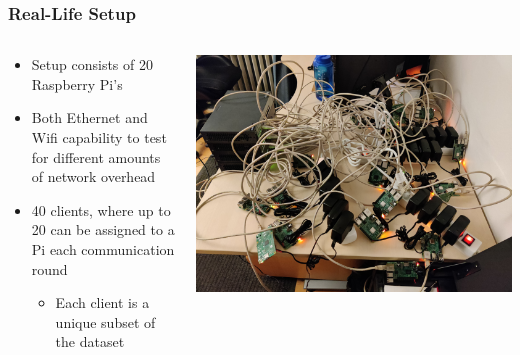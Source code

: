 \documentclass{beamer}
\begin{document}
\begin{frame}
    \frametitle{Real-Life Setup}
    \noindent
    \begin{columns}
	    \begin{column}{.5\textwidth}
		    \begin{itemize}
			    \item Setup consists of 20 Raspberry Pi's 
			    \item Both Ethernet and Wifi capability to test for different amounts of network overhead
			    \item 40 clients, where up to 20 can be assigned to a Pi each communication round
				    \begin{itemize}
					    \item Each client is a unique subset of the dataset
				    \end{itemize}
		    \end{itemize}    
	    \end{column}
	    \begin{column}{.5\textwidth}
		    \includegraphics[width=1\textwidth]{imgs/IMG_20220322_214443}
	    \end{column}
    \end{columns}
\end{frame}
\end{document}
